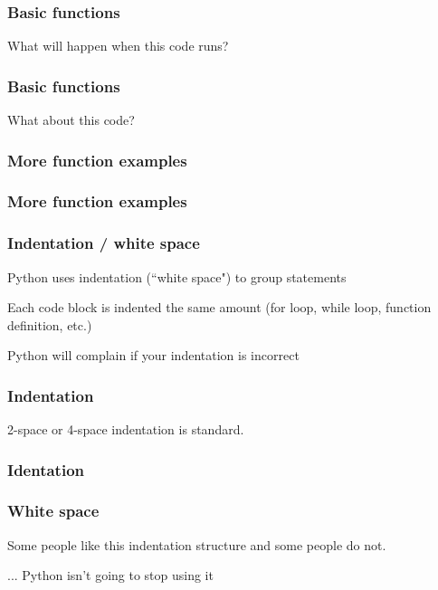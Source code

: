 \documentclass{beamer}
\begin{document}
\begin{frame}
\frametitle{Basic functions}

What will happen when this code runs?



\end{frame}

\begin{frame}
\frametitle{Basic functions}

What about this code?

\end{frame}


\begin{frame}
\frametitle{More function examples}

\end{frame}

\begin{frame}
\frametitle{More function examples}

\end{frame}


\begin{frame}
\frametitle{Indentation / white space}

Python uses indentation (``white space") to group statements

\vspace{0.15in}

Each code block is indented the same amount (for loop, while loop, function definition, etc.)

\vspace{0.15in}

Python will complain if your indentation is incorrect
\end{frame}

\begin{frame}
\frametitle{Indentation}


2-space or 4-space indentation is standard.

\end{frame}


\begin{frame}
\frametitle{Identation}


\end{frame}

\begin{frame}
\frametitle{White space}

Some people like this indentation structure and some people do not.

\vspace{0.2in}

... Python isn't going to stop using it

\end{frame}
\end{document}
